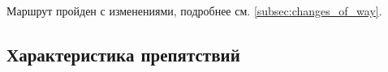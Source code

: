		Маршрут пройден с изменениями, подробнее см. \ref{subsec:changes_of_way}.

	
	\subsection{Характеристика препятствий}\label{subsec:main_obstacles}
%
%		
%		
%

